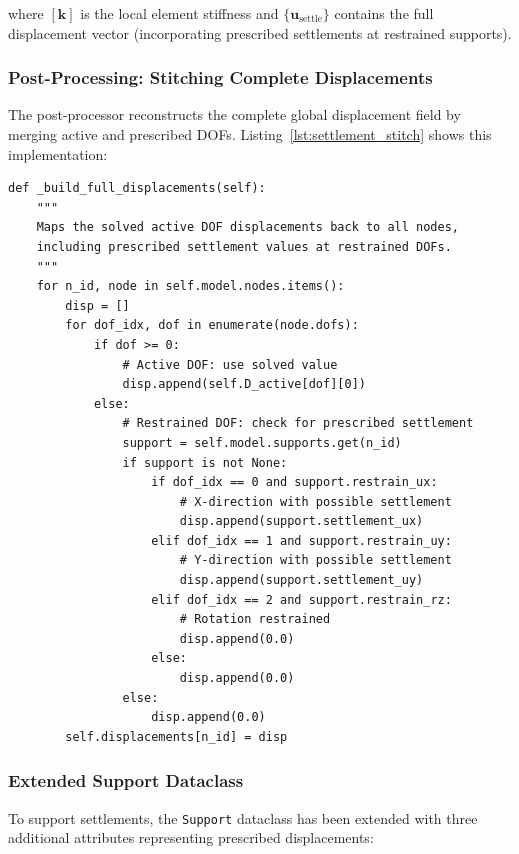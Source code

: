 \documentclass[12pt,a4paper]{article}
\begin{document}
\noindent where $[\mathbf{k}]$ is the local element stiffness and $\{\mathbf{u}_{\text{settle}}\}$ contains the full displacement vector (incorporating prescribed settlements at restrained supports).

\subsubsection{Post-Processing: Stitching Complete Displacements}

The post-processor reconstructs the complete global displacement field by merging active and prescribed DOFs. Listing~\ref{lst:settlement_stitch} shows this implementation:

\begin{lstlisting}[caption=Settlement Displacement Stitching (post_processor.py), label=lst:settlement_stitch, basicstyle=\ttfamily\small]
def _build_full_displacements(self):
    """
    Maps the solved active DOF displacements back to all nodes,
    including prescribed settlement values at restrained DOFs.
    """
    for n_id, node in self.model.nodes.items():
        disp = []
        for dof_idx, dof in enumerate(node.dofs):
            if dof >= 0:
                # Active DOF: use solved value
                disp.append(self.D_active[dof][0])
            else:
                # Restrained DOF: check for prescribed settlement
                support = self.model.supports.get(n_id)
                if support is not None:
                    if dof_idx == 0 and support.restrain_ux:
                        # X-direction with possible settlement
                        disp.append(support.settlement_ux)
                    elif dof_idx == 1 and support.restrain_uy:
                        # Y-direction with possible settlement
                        disp.append(support.settlement_uy)
                    elif dof_idx == 2 and support.restrain_rz:
                        # Rotation restrained
                        disp.append(0.0)
                    else:
                        disp.append(0.0)
                else:
                    disp.append(0.0)
        self.displacements[n_id] = disp
\end{lstlisting}

\subsubsection{Extended Support Dataclass}

To support settlements, the \texttt{Support} dataclass has been extended with three additional attributes representing prescribed displacements:
\end{document}
